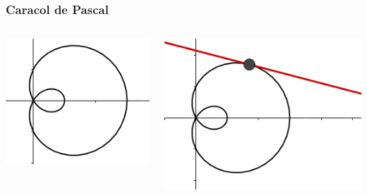 \documentclass{beamer}
\begin{document}
\begin{frame}
    \frametitle{Caracol de Pascal}
    \begin{columns}
        \begin{center}
            \includegraphics[scale=0.5]{../gfx/limacon2}
        \end{center}
        \begin{center}
            \includegraphics[scale=0.5]{../gfx/limacon}
        \end{center}
    \end{columns}
\end{frame}
\end{document}
